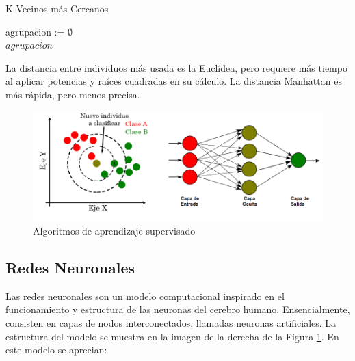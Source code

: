 		\begin{algorithm}
			\caption{K-Vecinos más Cercanos}
			agrupacion := $\emptyset$\\
			\Return $agrupacion$
		\end{algorithm}
		
		La distancia entre individuos más usada es la Euclídea, pero requiere más tiempo al aplicar potencias y raíces cuadradas en su cálculo. La distancia Manhattan es más rápida, pero menos precisa.



		
		
		\begin{figure}[!ht]
			\centering
			\includegraphics[width=\textwidth]{images/chapter_2/knn_redneu}
			\caption{Algoritmos de aprendizaje supervisado}
			\label{fig:aprendizaje_supervisado}
		\end{figure}

	\subsection{Redes Neuronales}

		Las redes neuronales son un modelo computacional inspirado en el funcionamiento y estructura de las neuronas del cerebro humano. Ensencialmente, consisten en capas de nodos interconectados, llamadas neuronas artificiales. La estructura del modelo se muestra en la imagen de la derecha de la Figura \ref{fig:aprendizaje_supervisado}. En este modelo se aprecian:


